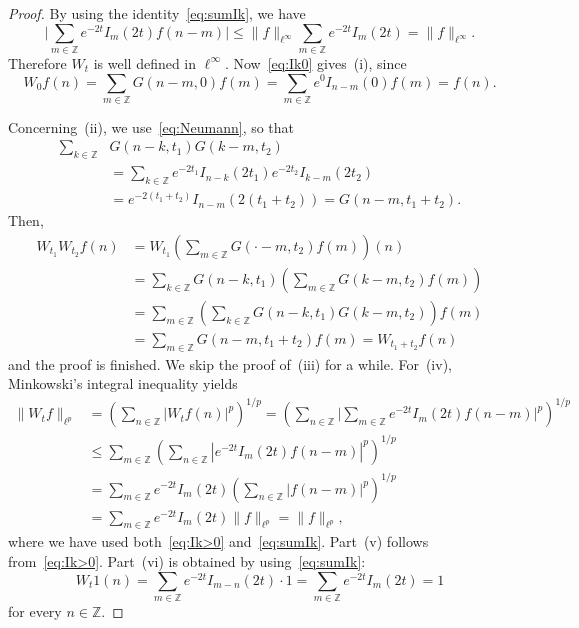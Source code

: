 \documentclass[11pt]{amsart}
\numberwithin{equation}{section}
\newcommand{\Z}{\mathbb{Z}}
\theoremstyle{plain}
\theoremstyle{remark}
\begin{document}
\begin{proof}
By using the identity~\eqref{eq:sumIk}, we have
\[
\biggl|\sum_{m\in\Z} e^{-2t} I_m(2t) f(n-m) \biggr|
\le \|f\|_{\ell^\infty} \sum_{m\in\Z} e^{-2t} I_m(2t) = \|f\|_{\ell^\infty}.
\]
Therefore $W_t$ is well defined in $\ell^\infty.$ Now~\eqref{eq:Ik0} gives~(i), since
\[
  W_0f(n) = \sum_{m\in\Z} G(n-m,0) f(m) = \sum_{m\in\Z} e^{0} I_{n-m}(0) f(m) = f(n).
\]

Concerning~(ii), we use~\eqref{eq:Neumann}, so that
\begin{align*}
  \sum_{k \in\Z} &G(n-k,t_1) G(k-m,t_2) \\
  &= \sum_{k \in\Z} e^{-2t_1} I_{n-k}(2t_1) e^{-2t_2} I_{k-m}(2t_2) \\
  &= e^{-2(t_1+t_2)} I_{n-m}(2(t_1+t_2))
  = G(n-m,t_1+t_2).
\end{align*}
Then,
\begin{align*}
  W_{t_1}W_{t_2}f(n) &= W_{t_1} \left(\sum_{m\in\Z} G( \cdot - m,t_2) f(m) \right) (n) \\
  &= \sum_{k\in\Z} G(n-k,t_1) \left(\sum_{m\in\Z} G(k-m,t_2) f(m) \right) \\
  &= \sum_{m\in\Z} \left(\sum_{k\in\Z} G(n-k,t_1) G(k-m,t_2) \right) f(m) \\
  &= \sum_{m\in\Z} G(n-m,t_1+t_2)f(m) = W_{t_1+t_2}f(n)
\end{align*}
and the proof is finished. We skip the proof of~(iii) for a while.
For~(iv), Minkowski's integral inequality yields
\begin{align*}
  \|W_t f\|_{\ell^p}
  &= \left( \sum_{n\in\Z} |W_tf(n)|^p \right)^{1/p}
  = \left( \sum_{n\in\Z} \biggl| \sum_{m\in\Z} e^{-2t} I_m(2t) f(n-m) \biggr|^p \right)^{1/p} \\
  &\le \sum_{m\in\Z} \left( \sum_{n\in\Z} |e^{-2t} I_m(2t) f(n-m)|^p \right)^{1/p} \\
  &= \sum_{m\in\Z} e^{-2t} I_m(2t) \left( \sum_{n\in\Z} |f(n-m)|^p \right)^{1/p} \\
  &= \sum_{m\in\Z} e^{-2t} I_m(2t) \|f\|_{\ell^p} = \|f\|_{\ell^p},
\end{align*}
where we have used both~\eqref{eq:Ik>0} and~\eqref{eq:sumIk}. Part~(v) follows from~\eqref{eq:Ik>0}. Part~(vi) is obtained by using~\eqref{eq:sumIk}:
\[
  W_t 1(n) = \sum_{m\in\Z} e^{-2t} I_{m-n}(2t) \cdot 1 = \sum_{m\in\Z} e^{-2t} I_{m}(2t) = 1
\]
for every $n \in \Z$.


\end{proof}
\end{document}
